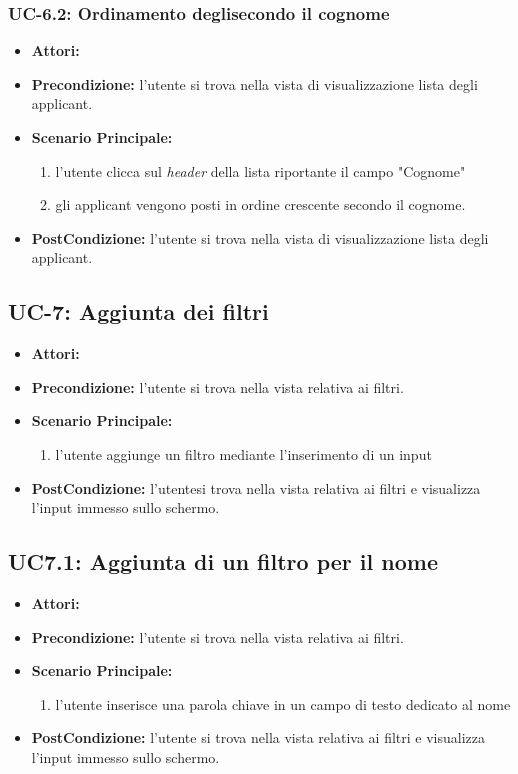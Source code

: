 \subsubsection{UC-6.2: Ordinamento degli\applicant secondo il cognome}
\begin{itemize}
	\item \textbf{Attori:}\loggedusr
	\item \textbf{Precondizione:} l'utente si trova nella vista di visualizzazione lista degli applicant.
	\item \textbf{Scenario Principale:}
	\begin{enumerate}
		\item l'utente clicca sul \textit{header} della lista riportante il campo "Cognome"
		\item gli applicant vengono posti in ordine crescente secondo il cognome.
	\end{enumerate}
	\item \textbf{PostCondizione:}  l'utente si trova nella vista di visualizzazione lista degli applicant.
\end{itemize}

\subsection{UC-7: Aggiunta dei filtri}
\begin{itemize}
\item \textbf{Attori:}\loggedusr
\item \textbf{Precondizione:} l'utente si trova nella vista relativa ai filtri.
\item \textbf{Scenario Principale:}
\begin{enumerate}
	\item l'utente aggiunge un filtro mediante l'inserimento di un input
\end{enumerate}
\item \textbf{PostCondizione:} l'utentesi trova nella vista relativa ai filtri e visualizza l'input immesso sullo schermo.
\end{itemize}

\subsection{UC7.1: Aggiunta di un filtro per il nome}
\begin{itemize}
\item \textbf{Attori:}\loggedusr
\item \textbf{Precondizione:} l'utente si trova nella vista relativa ai filtri.
\item \textbf{Scenario Principale:}
\begin{enumerate}
	\item l'utente inserisce una parola chiave in un campo di testo dedicato al nome
\end{enumerate}
\item \textbf{PostCondizione:}  l'utente si trova nella vista relativa ai filtri e visualizza l'input immesso sullo schermo.
\end{itemize}

